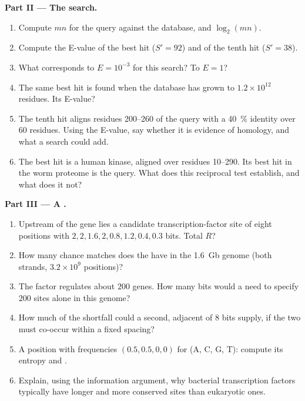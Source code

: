 \begin{problem}
\medskip
\noindent\textbf{Part II --- The search.}
\begin{enumerate}[resume]
  \item Compute $mn$ for the query against the database, and
        $\log_{2}(mn)$.
  \item Compute the E-value of the best hit ($S' = 92$) and of the
        tenth hit ($S' = 38$).
  \item What  corresponds to $E = 10^{-3}$ for this search?
        To $E = 1$?
  \item The same best hit is found when the database has grown to
        $1.2\times 10^{12}$ residues. Its E-value?
  \item The tenth hit aligns residues 200--260 of the query with a
        \qty{40}{\%} identity over $60$ residues. Using the E-value,
        say whether it is evidence of homology, and what a 
        search could add.
  \item The best hit is a human kinase, aligned over residues 10--290.
        Its best hit in the worm proteome is the query. What does
        this reciprocal test establish, and what does it not?
\end{enumerate}

\medskip
\noindent\textbf{Part III --- A .}
\begin{enumerate}[resume]
  \item Upstream of the gene lies a candidate transcription-factor
        site of eight positions with 
        $2, 2, 1.6, 2, 0.8, 1.2, 0.4, 0.3$ bits. Total $R$?
  \item How many chance matches does the  have in the
        \qty{1.6}{Gb} genome (both strands, $3.2\times 10^{9}$
        positions)?
  \item The factor regulates about $200$ genes. How many bits would a
         need to specify $200$ sites alone in this genome?
  \item How much of the shortfall could a second, adjacent  of
        $8$ bits supply, if the two must co-occur within a fixed
        spacing?
  \item A position with frequencies $(0.5, 0.5, 0, 0)$ for (A, C, G,
        T): compute its entropy and .
  \item Explain, using the information argument, why bacterial
        transcription factors typically have longer and more
        conserved sites than eukaryotic ones.
\end{enumerate}


\end{problem}
